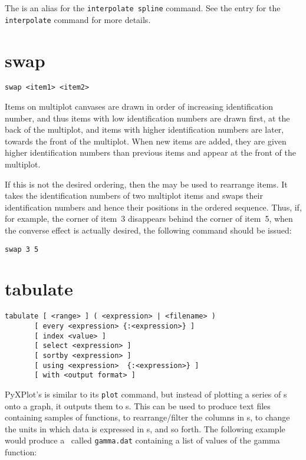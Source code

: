 The  is an alias for the {\tt interpolate spline} command.
See the entry for the {\tt interpolate} command for more details.


\section{swap}

\begin{verbatim}
swap <item1> <item2>
\end{verbatim}

Items on multiplot canvases are drawn in order of increasing identification
number, and thus items with low identification numbers are drawn first, at the
back of the multiplot, and items with higher identification numbers are later,
towards the front of the multiplot. When new items are added, they are given
higher identification numbers than previous items and appear at the front of
the multiplot.

If this is not the desired ordering, then the  may be used to
rearrange items. It takes the identification numbers of two multiplot items and
swaps their identification numbers and hence their positions in the ordered
sequence.  Thus, if, for example, the corner of item~3 disappears behind the
corner of item~5, when the converse effect is actually desired, the following
command should be issued:
\begin{verbatim}
swap 3 5
\end{verbatim}


\section{tabulate}

\begin{verbatim}
tabulate [ <range> ] ( <expression> | <filename> )
       [ every <expression> {:<expression>} ]
       [ index <value> ]
       [ select <expression> ]
       [ sortby <expression> ]
       [ using <expression>  {:<expression>} ]
       [ with <output format> ]
\end{verbatim}

PyXPlot's  is similar to its {\tt plot} command, but instead
of plotting a series of \datapoint s onto a graph, it outputs them to \datafile
s. This can be used to produce text files containing samples of functions, to
rearrange/filter the columns in \datafile s, to change the units in which data
is expressed in \datafile s, and so forth.  The following example would produce
a \datafile\ called {\tt gamma.dat} containing a list of values of the gamma
function:

